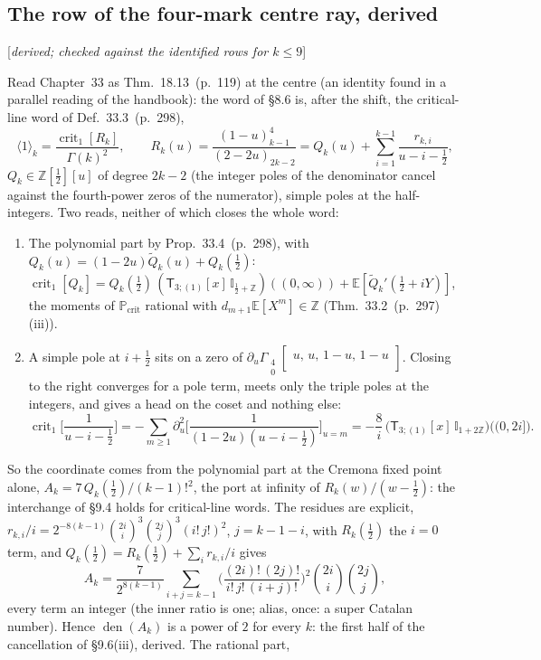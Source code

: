 \documentclass[11pt]{article}
\newcommand{\oE}{\mathbb E}
\newcommand{\sT}{\mathsf T}
\newcommand{\Gst}[4]{\Gamma_{\substack{#1\\#2}}\!\begin{bmatrix}#3\\#4\end{bmatrix}}
\newcommand{\Ilat}[1]{\mathbb I_{#1}}
\newcommand{\Tx}[3]{(\sT_{#1;(1)}[x]\,#2)((#3,\infty))}
\newcommand{\status}[1]{\hfill{\small[\textit{#1}]}}
\newcommand{\hb}[2]{#1~(p.~#2)}   %
\theoremstyle{plain}
\theoremstyle{remark}
\begin{document}
\subsection{The row of the four-mark centre ray, derived}\status{derived; checked against the identified rows for $k\le9$}

Read Chapter~33 as Thm.~\hb{18.13}{119} at the centre (an identity found in a parallel reading of the handbook): the word of \S8.6 is, after the shift, the critical-line word of Def.~\hb{33.3}{298},
\[
\langle1\rangle_k=\frac{\operatorname{crit}_1[R_k]}{\Gamma(k)^2},\qquad R_k(u)=\frac{(1-u)_{k-1}^4}{(2-2u)_{2k-2}}=Q_k(u)+\sum_{i=1}^{k-1}\frac{r_{k,i}}{u-i-\frac12},
\]
$Q_k\in\mathbb Z[\tfrac12][u]$ of degree $2k-2$ (the integer poles of the denominator cancel against the fourth-power zeros of the numerator), simple poles at the half-integers. Two reads, neither of which closes the whole word:
\begin{enumerate}[label=(\roman*)]
\item The polynomial part by Prop.~\hb{33.4}{298}, with $Q_k(u)=(1-2u)\widetilde Q_k(u)+Q_k(\frac12)$: $\operatorname{crit}_1[Q_k]=Q_k(\frac12)\,\Tx{3}{\Ilat{\frac12+\mathbb Z}}{0}+\oE[\widetilde Q_k'(\frac12+iY)]$, the moments of $\mathbb P_{\mathrm{crit}}$ rational with $d_{m+1}\oE[X^m]\in\mathbb Z$ (Thm.~\hb{33.2}{297}(iii)).
\item A simple pole at $i+\frac12$ sits on a zero of $\partial_u\Gst40{u,\,u,\,1-u,\,1-u}{}$. Closing to the right converges for a pole term, meets only the triple poles at the integers, and gives a head on the coset and nothing else:
\[
\operatorname{crit}_1\Big[\frac1{u-i-\frac12}\Big]=-\sum_{m\ge1}\partial_u^2\Big[\frac1{(1-2u)(u-i-\frac12)}\Big]_{u=m}=-\frac8i\,\big(\sT_{3;(1)}[x]\,\Ilat{1+2\mathbb Z}\big)\big((0,2i]\big).
\]
\end{enumerate}
So the coordinate comes from the polynomial part at the Cremona fixed point alone, $A_k=7\,Q_k(\frac12)/(k-1)!^2$, the port at infinity of $R_k(w)/(w-\frac12)$: the interchange of \S9.4 holds for critical-line words. The residues are explicit, $r_{k,i}/i=2^{-8(k-1)}\binom{2i}{i}^3\binom{2j}{j}^3(i!\,j!)^2$, $j=k-1-i$, with $R_k(\frac12)$ the $i=0$ term, and $Q_k(\frac12)=R_k(\frac12)+\sum_ir_{k,i}/i$ gives
\[
A_k=\frac{7}{2^{8(k-1)}}\sum_{i+j=k-1}\Big(\frac{(2i)!\,(2j)!}{i!\,j!\,(i+j)!}\Big)^2\binom{2i}{i}\binom{2j}{j},
\]
every term an integer (the inner ratio is one; alias, once: a super Catalan number). Hence $\operatorname{den}(A_k)$ is a power of $2$ for every $k$: the first half of the cancellation of \S9.6(iii), derived. The rational part,
\end{document}
